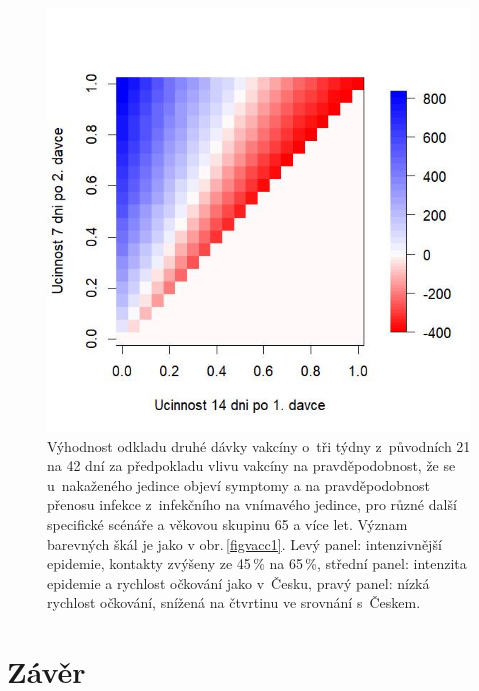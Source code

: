 \begin{figure}[ht]
\begin{center}
\begin{minipage}[m]{0.3\linewidth}
		\end{minipage}
		\begin{minipage}[m]{0.3\linewidth}
			\includegraphics[width=\textwidth]{pic/SA4lessL_DIFF_mean_T.jpg}
		\end{minipage}
	\end{center}
	\caption{Výhodnost odkladu druhé dávky vakcíny o~tři týdny z~původních 21 na 42 dní za předpokladu vlivu vakcíny na pravděpodobnost, že se u~nakaženého jedince objeví symptomy a na pravděpodobnost přenosu infekce z~infekčního na vnímavého jedince, pro různé další specifické scénáře a věkovou skupinu 65 a více let. Význam barevných škál je jako v obr.\,\ref{figvacc1}. Levý panel: intenzivnější epidemie, kontakty zvýšeny ze 45\,\% na 65\,\%, střední panel: intenzita epidemie a rychlost očkování jako v~Česku, pravý panel: nízká rychlost očkování, snížená na čtvrtinu ve srovnání s~Českem.}
	\label{figvacc3}
\end{figure}

\section*{Závěr}

